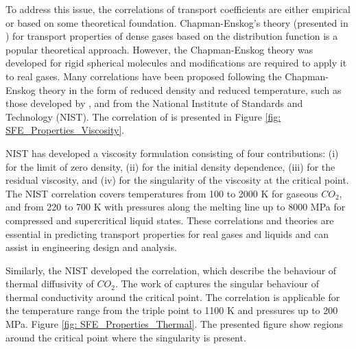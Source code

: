 \documentclass[../Article_Model_Parameters.tex]{subfiles}
\begin{document}
	To address this issue, the correlations of transport coefficients are either empirical or based on some theoretical foundation. Chapman-Enskog's theory (presented in \citet{Chapman1991}) for transport properties of dense gases based on the distribution function is a popular theoretical approach. However, the Chapman-Enskog theory was developed for rigid spherical molecules and modifications are required to apply it to real gases. Many correlations have been proposed following the Chapman-Enskog theory in the form of reduced density and reduced temperature, such as those developed by \citet{Fenghour1998}, and \citet{Laesecke2017} from the National Institute of Standards and Technology (NIST). The correlation of \citet{Laesecke2017} is presented in Figure \ref{fig: SFE_Properties_Viscosity}.
	
	NIST has developed a viscosity formulation consisting of four contributions: (i) for the limit of zero density, (ii) for the initial density dependence, (iii) for the residual viscosity, and (iv) for the singularity of the viscosity at the critical point. The NIST correlation covers temperatures from 100 to 2000 K for gaseous $CO_2$, and from 220 to 700 K with pressures along the melting line up to 8000 MPa for compressed and supercritical liquid states. These correlations and theories are essential in predicting transport properties for real gases and liquids and can assist in engineering design and analysis.
	
	
	Similarly, the NIST developed the correlation, which describe the behaviour of thermal diffusivity of $CO_2$. The work of \citet{Huber2016} captures the singular behaviour of thermal conductivity around the critical point. The correlation is applicable for the temperature range from the triple point to 1100 K and pressures up to 200 MPa. Figure \ref{fig: SFE_Properties_Thermal}. The presented figure show regions around the critical point where the singularity is present.
	
\end{document}
